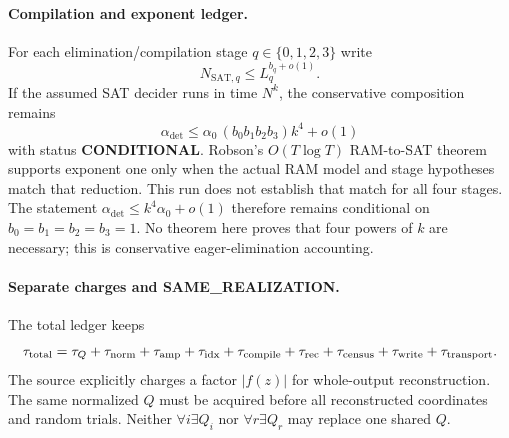 \documentclass[11pt]{article}
\begin{document}
\paragraph{Compilation and exponent ledger.}
For each elimination/compilation stage $q\in\{0,1,2,3\}$ write
\[
N_{\mathrm{SAT},q}\le L_q^{b_q+o(1)}.
\]
If the assumed SAT decider runs in time $N^k$, the conservative composition remains
\[
\boxed{
\alpha_{\mathrm{det}}
\le
\alpha_0\,(b_0b_1b_2b_3)k^4+o(1)
}
\]
with status \textbf{CONDITIONAL}. Robson's $O(T\log T)$ RAM-to-SAT theorem supports exponent one only when the actual RAM model and stage hypotheses match that reduction. This run does not establish that match for all four stages. The statement $\alpha_{\mathrm{det}}\le k^4\alpha_0+o(1)$ therefore remains conditional on $b_0=b_1=b_2=b_3=1$. No theorem here proves that four powers of $k$ are necessary; this is conservative eager-elimination accounting.

\paragraph{Separate charges and SAME_REALIZATION.}
The total ledger keeps
\[
\tau_{\rm total}=
\tau_Q+\tau_{\rm norm}+\tau_{\rm amp}+\tau_{\rm idx}
+\tau_{\rm compile}+\tau_{\rm rec}+\tau_{\rm census}
+\tau_{\rm write}+\tau_{\rm transport}.
\]
The source explicitly charges a factor $|f(z)|$ for whole-output reconstruction. The same normalized $Q$ must be acquired before all reconstructed coordinates and random trials. Neither $\forall i\exists Q_i$ nor $\forall r\exists Q_r$ may replace one shared $Q$.
\end{document}
